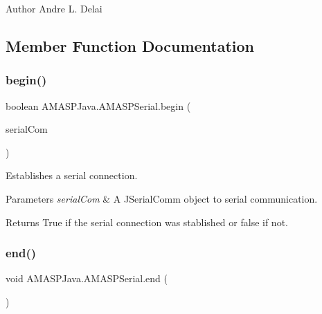 \begin{DoxyAuthor}{Author}
Andre L. Delai 
\end{DoxyAuthor}


\subsection{Member Function Documentation}
\mbox{\label{class_a_m_a_s_p_java_1_1_a_m_a_s_p_serial_ae1706e1eae0bcc63b42229e70b3f8c04}} 
\subsubsection{\texorpdfstring{begin()}{begin()}}
{\footnotesize\ttfamily boolean A\+M\+A\+S\+P\+Java.\+A\+M\+A\+S\+P\+Serial.\+begin (\begin{DoxyParamCaption}\item[{Serial\+Port}]{serial\+Com }\end{DoxyParamCaption})}

Establishes a serial connection.


\begin{DoxyParams}{Parameters}
{\em serial\+Com} & A J\+Serial\+Comm object to serial communication. \\
\hline
\end{DoxyParams}
\begin{DoxyReturn}{Returns}
True if the serial connection was stablished or false if not. 
\end{DoxyReturn}
\mbox{\label{class_a_m_a_s_p_java_1_1_a_m_a_s_p_serial_a86f80b182b170fee48a6f13a3672c032}} 
\subsubsection{\texorpdfstring{end()}{end()}}
{\footnotesize\ttfamily void A\+M\+A\+S\+P\+Java.\+A\+M\+A\+S\+P\+Serial.\+end (\begin{DoxyParamCaption}{ }\end{DoxyParamCaption})}

